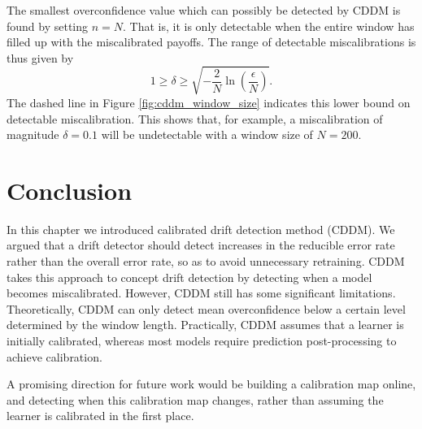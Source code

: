 The smallest overconfidence value which can possibly be detected by CDDM is found by setting $n=N$. That is, it is only detectable when the entire window has filled up with the miscalibrated payoffs. The range of detectable miscalibrations is thus given by 
\begin{equation}
    1 \ge \delta \ge \sqrt{-\frac{2}{N}\ln\left(\frac{\epsilon}{N}\right)}. \label{eq:window_size}
\end{equation}
The dashed line in Figure \ref{fig:cddm_window_size} indicates this lower bound on detectable miscalibration. This shows that, for example, a miscalibration of magnitude $\delta=0.1$ will be undetectable with a window size of $N=200$.


\section{Conclusion} \label{CDDM:conclusion}

In this chapter we introduced calibrated drift detection method (CDDM). We argued that a drift detector should detect increases in the reducible error rate rather than the overall error rate, so as to avoid unnecessary retraining. CDDM takes this approach to concept drift detection by detecting when a model becomes miscalibrated. However, CDDM still has some significant limitations. Theoretically, CDDM can only detect mean overconfidence below a certain level determined by the window length. Practically, CDDM assumes that a learner is initially calibrated, whereas most models require prediction post-processing to achieve calibration.

A promising direction for future work would be building a calibration map online, and detecting when this calibration map changes, rather than assuming the learner is calibrated in the first place.